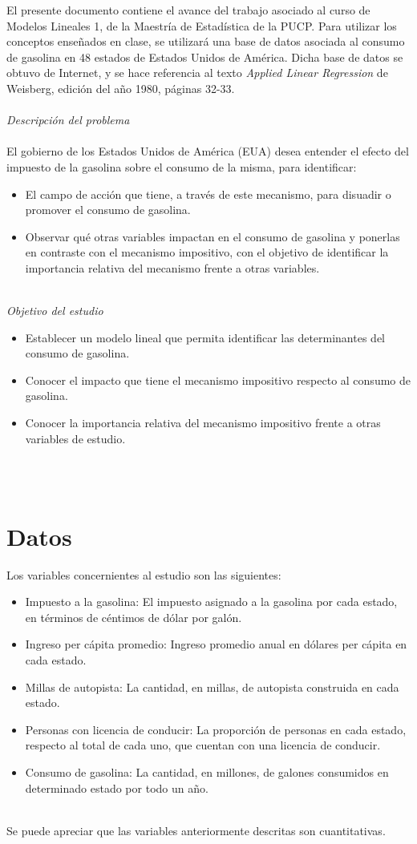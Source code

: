 \documentclass[%
reprint,
 amsmath,amssymb,
 aps,
]{revtex4-1}
\begin{document}
El presente documento contiene el avance del trabajo asociado al curso de Modelos Lineales 1, de la Maestr\'ia de Estad\'istica de la PUCP. Para utilizar los conceptos ense\~nados en clase, se utilizar\'a una base de datos asociada al consumo de gasolina en 48 estados de Estados Unidos de Am\'erica. Dicha base de datos se obtuvo de Internet, y se hace referencia al texto \textit{Applied Linear Regression} de Weisberg, edici\'on del a\~no 1980, p\'aginas 32-33.
\\
\\
\textit{Descripci\'on del problema}
\\
\\
El gobierno de los Estados Unidos de Am\'erica (EUA) desea entender el efecto del impuesto de la gasolina sobre el consumo de la misma, para identificar:
\begin{itemize}
\item El campo de acci\'on que tiene, a trav\'es de este mecanismo, para disuadir o promover el consumo de gasolina.
\item Observar qu\'e otras variables impactan en el consumo de gasolina y ponerlas en contraste con el mecanismo impositivo, con el objetivo de identificar la importancia relativa del mecanismo frente a otras variables.
\end{itemize}
\\
\textit{Objetivo del estudio}
\begin{itemize}
\item Establecer un modelo lineal que permita identificar las determinantes del consumo de gasolina.
\item Conocer el impacto que tiene el mecanismo impositivo respecto al consumo de gasolina.
\item Conocer la importancia relativa del mecanismo impositivo frente a otras variables de estudio.
\end{itemize}
\\
\\
\section{\label{sec:level2} Datos}
Los variables concernientes al estudio son las siguientes:
\begin{itemize}
\item Impuesto a la gasolina: El impuesto asignado a la gasolina por cada estado, en t\'erminos de c\'entimos de d\'olar por gal\'on.
\item Ingreso per c\'apita promedio: Ingreso promedio anual en d\'olares per c\'apita en cada estado.
\item Millas de autopista: La cantidad, en millas, de autopista construida en cada estado.
\item Personas con licencia de conducir: La proporci\'on de personas en cada estado, respecto al total de cada uno, que cuentan con una licencia de conducir.
\item Consumo de gasolina: La cantidad, en millones, de galones consumidos en determinado estado por todo un a\~no.
\end{itemize}
\\
Se puede apreciar que las variables anteriormente descritas son cuantitativas.
\end{document}
